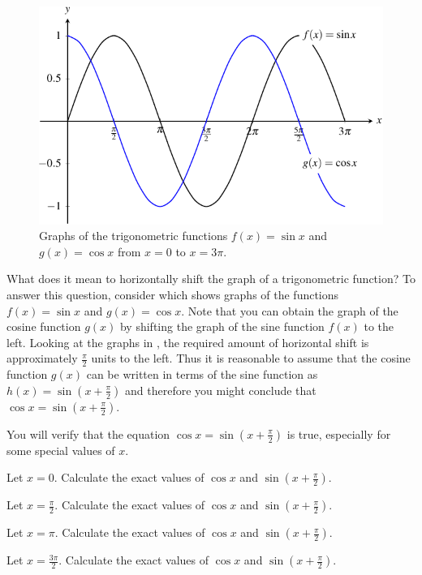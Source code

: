 \documentclass[a4paper,oneside,12pt]{article}
\begin{document}
\begin{figure}[!htbp]
\centering
\includegraphics[scale=1.1]{image/13/sin-cos.pdf}
\caption{%
  Graphs of the trigonometric functions $f(x) = \sin x$ and
  $g(x) = \cos x$ from $x = 0$ to $x = 3\pi$.
}
\label{fig:trigonometric:standard_sine_cosine}
\end{figure}

What does it mean to horizontally shift the graph of a trigonometric
function?  To answer this question, consider
 which shows graphs of
the functions $f(x) = \sin x$ and $g(x) = \cos x$.  Note that you can
obtain the graph of the cosine function $g(x)$ by shifting the graph
of the sine function $f(x)$ to the left.  Looking at the graphs in
, the required amount
of horizontal shift is approximately $\frac{\pi}{2}$ units to the
left.  Thus it is reasonable to assume that the cosine function $g(x)$
can be written in terms of the sine function as
$h(x) = \sin(x + \frac{\pi}{2})$ and therefore you might conclude that
$\cos x = \sin(x + \frac{\pi}{2})$.

\begin{exercise}
You will verify that the equation $\cos x = \sin(x + \frac{\pi}{2})$
is true, especially for some special values of $x$.
\begin{packedenum}
\item\label{subex:trigonometric:sin_left_shift_0}
  Let $x = 0$.  Calculate the exact values of $\cos x$ and
  $\sin(x + \frac{\pi}{2})$.

\item\label{subex:trigonometric:sin_left_shift_pi_half}
  Let $x = \frac{\pi}{2}$.  Calculate the exact values of $\cos x$ and
  $\sin(x + \frac{\pi}{2})$.

\item\label{subex:trigonometric:sin_left_shift_pi}
  Let $x = \pi$.  Calculate the exact values of $\cos x$ and
  $\sin(x + \frac{\pi}{2})$.

\item\label{subex:trigonometric:sin_left_shift_3pi_half}
  Let $x = \frac{3\pi}{2}$.  Calculate the exact values of $\cos x$
  and $\sin(x + \frac{\pi}{2})$.
\end{packedenum}
\end{exercise}
\end{document}
